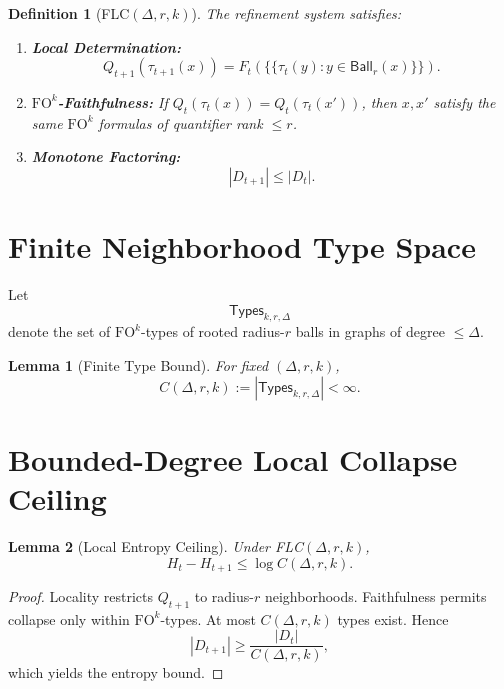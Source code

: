 \documentclass[11pt]{article}
\newtheorem{definition}{Definition}
\newtheorem{lemma}{Lemma}
\newcommand{\Ball}{\mathsf{Ball}}
\newcommand{\FO}{\mathrm{FO}}
\newcommand{\Types}{\mathsf{Types}}
\begin{document}
\begin{definition}[FLC$(\Delta,r,k)$]
The refinement system satisfies:

\begin{enumerate}[label=(\alph*)]
\item \textbf{Local Determination:}
\[
Q_{t+1}(\tau_{t+1}(x))
=
F_t\!\left(\{\!\{\tau_t(y):y\in\Ball_r(x)\}\!\}\right).
\]

\item \textbf{$\FO^k$-Faithfulness:}
If $Q_t(\tau_t(x)) = Q_t(\tau_t(x'))$,
then $x,x'$ satisfy the same $\FO^k$ formulas
of quantifier rank $\le r$.

\item \textbf{Monotone Factoring:}
\[
|D_{t+1}| \le |D_t|.
\]
\end{enumerate}
\end{definition}

\section{Finite Neighborhood Type Space}

Let
\[
\Types_{k,r,\Delta}
\]
denote the set of $\FO^k$-types of rooted radius-$r$ balls
in graphs of degree $\le \Delta$.

\begin{lemma}[Finite Type Bound]
For fixed $(\Delta,r,k)$,
\[
C(\Delta,r,k)
:=
|\Types_{k,r,\Delta}|
< \infty.
\]
\end{lemma}

\section{Bounded-Degree Local Collapse Ceiling}

\begin{lemma}[Local Entropy Ceiling]
Under FLC$(\Delta,r,k)$,
\[
H_t - H_{t+1}
\le
\log C(\Delta,r,k).
\]
\end{lemma}

\begin{proof}
Locality restricts $Q_{t+1}$ to radius-$r$ neighborhoods.
Faithfulness permits collapse only within $\FO^k$-types.
At most $C(\Delta,r,k)$ types exist.
Hence
\[
|D_{t+1}|
\ge
\frac{|D_t|}{C(\Delta,r,k)},
\]
which yields the entropy bound.
\end{proof}
\end{document}
